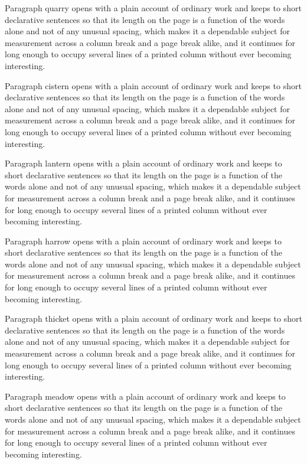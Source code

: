 \documentclass{article}
\begin{document}
Paragraph quarry opens with a plain account of ordinary work and keeps to short declarative sentences so that its length on the page is a function of the words alone and not of any unusual spacing, which makes it a dependable subject for measurement across a column break and a page break alike, and it continues for long enough to occupy several lines of a printed column without ever becoming interesting.

Paragraph cistern opens with a plain account of ordinary work and keeps to short declarative sentences so that its length on the page is a function of the words alone and not of any unusual spacing, which makes it a dependable subject for measurement across a column break and a page break alike, and it continues for long enough to occupy several lines of a printed column without ever becoming interesting.

Paragraph lantern opens with a plain account of ordinary work and keeps to short declarative sentences so that its length on the page is a function of the words alone and not of any unusual spacing, which makes it a dependable subject for measurement across a column break and a page break alike, and it continues for long enough to occupy several lines of a printed column without ever becoming interesting.

Paragraph harrow opens with a plain account of ordinary work and keeps to short declarative sentences so that its length on the page is a function of the words alone and not of any unusual spacing, which makes it a dependable subject for measurement across a column break and a page break alike, and it continues for long enough to occupy several lines of a printed column without ever becoming interesting.

Paragraph thicket opens with a plain account of ordinary work and keeps to short declarative sentences so that its length on the page is a function of the words alone and not of any unusual spacing, which makes it a dependable subject for measurement across a column break and a page break alike, and it continues for long enough to occupy several lines of a printed column without ever becoming interesting.

Paragraph meadow opens with a plain account of ordinary work and keeps to short declarative sentences so that its length on the page is a function of the words alone and not of any unusual spacing, which makes it a dependable subject for measurement across a column break and a page break alike, and it continues for long enough to occupy several lines of a printed column without ever becoming interesting.
\end{document}

